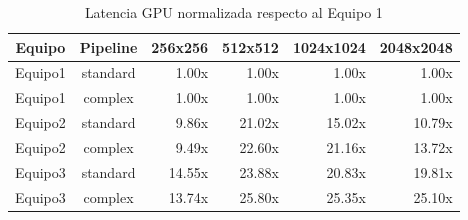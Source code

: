 \begin{table}[htbp]
\centering
\renewcommand{\arraystretch}{1.15}
\setlength{\tabcolsep}{5pt}
\begin{tabular}{|c|c|r|r|r|r|}
\hline
\rowcolor[gray]{0.90}
\textbf{Equipo} & \textbf{Pipeline} & \textbf{256x256} & \textbf{512x512} & \textbf{1024x1024} & \textbf{2048x2048} \\
\hline
Equipo1 & standard & 1.00x & 1.00x & 1.00x & 1.00x \\
\hline
Equipo1 & complex & 1.00x & 1.00x & 1.00x & 1.00x \\
\hline
Equipo2 & standard & 9.86x & 21.02x & 15.02x & 10.79x \\
\hline
Equipo2 & complex & 9.49x & 22.60x & 21.16x & 13.72x \\
\hline
Equipo3 & standard & 14.55x & 23.88x & 20.83x & 19.81x \\
\hline
Equipo3 & complex & 13.74x & 25.80x & 25.35x & 25.10x \\
\hline
\end{tabular}
\caption{Latencia GPU normalizada respecto al Equipo 1}
\label{tab:interteam_normalized_vs_equipo1_gpu}
\end{table}
